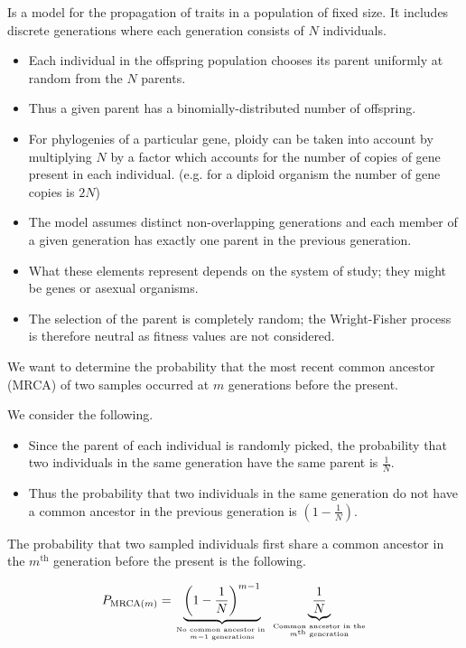 \documentclass{article}
\begin{document}
\begin{multicols*}{3}
Is a model for the propagation of traits in a population of fixed size. It includes discrete generations where each generation consists of $N$ individuals.
\begin{itemize}
    \item Each individual in the offspring population chooses its parent uniformly at random from the $N$ parents.
    \item Thus a given parent has a binomially-distributed number of offspring. 
    \item For phylogenies of a particular gene, ploidy can be taken into account by multiplying $N$ by a factor which accounts for the number of copies of gene present in each individual. (e.g. for a diploid organism the number of gene copies is $2N$)
    \item The model assumes distinct non-overlapping generations and each member of a given generation has exactly one parent in the previous generation. 
    \item What these elements represent depends on the system of study; they might be genes or asexual organisms. \item The selection of the parent is completely random; the Wright-Fisher process is therefore neutral as fitness values are not considered.  
\end{itemize}

We want to determine the probability that the most recent common ancestor (MRCA) of two samples occurred at $m$ generations before the present. 

We consider the following. 

\begin{itemize}
    \item Since the parent of each individual is randomly picked, the probability that two individuals in the same generation have the same parent is $\frac{1}{N}$. 
    \item Thus the probability that two individuals in the same generation do not have a common ancestor in the previous generation is $\left(1-\frac{1}{N}\right)$. 
\end{itemize}


The probability that two sampled individuals first share a common ancestor in the $m^{\text{th}}$ generation before the present is the following. 

\begin{align*}
P_{\text{MRCA}(m)} = \underbrace{\left(1-\frac{1}{N}\right)^{m-1}}_{\text{No common ancestor in }\atop m - 1 \text{ generations}}\underbrace{\frac{1}{N}}_{\text{Common ancestor in the}\atop m^{\text{th}} \text{ generation}}   
\end{align*}


\end{multicols*}
\end{document}
